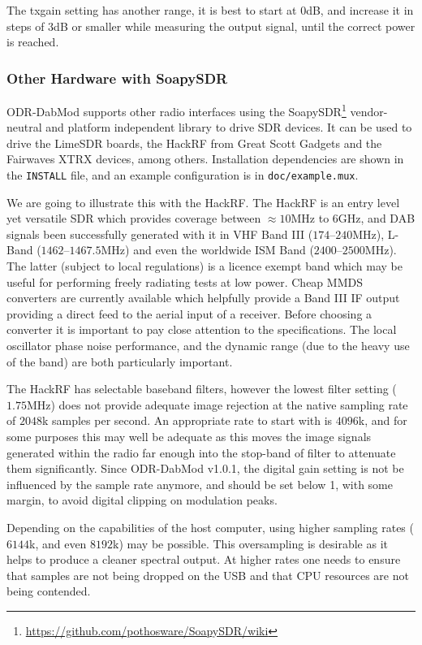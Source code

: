 The txgain setting has another range, it is best to start at $0$dB, and increase
it in steps of $3$dB or smaller while measuring the output signal, until the
correct power is reached.

\subsubsection{Other Hardware with SoapySDR}
\label{otherhardware}
ODR-DabMod supports other radio interfaces using the
SoapySDR\footnote{\url{https://github.com/pothosware/SoapySDR/wiki}}
vendor-neutral and platform independent library to drive SDR devices. It can be
used to drive the LimeSDR boards, the HackRF from Great Scott Gadgets and the
Fairwaves XTRX devices, among others. Installation dependencies are shown in the
\texttt{INSTALL} file, and an example configuration is in
\texttt{doc/example.mux}.

We are going to illustrate this with the HackRF.
The HackRF is an entry level yet versatile SDR which provides coverage between
$\approx10$MHz to $6$GHz, and DAB signals been successfully generated with it in
VHF Band III ($174$--$240$MHz), L-Band ($1462$--$1467.5$MHz) and even the worldwide ISM
Band ($2400$--$2500$MHz). The latter (subject to local regulations) is a licence exempt
band which may be useful for performing freely radiating tests at low power. Cheap
MMDS converters are currently available which helpfully provide a Band III IF output
providing a direct feed to the aerial input of a receiver. Before choosing a converter
it is important to pay close attention to the specifications. The local oscillator
phase noise performance, and the dynamic range (due to the heavy use of the band) are
both particularly important.

The HackRF has selectable baseband filters, however the lowest filter setting
($1.75$MHz) does not provide adequate image rejection at the native sampling rate of
$2048$k samples per second. An appropriate rate to start with is $4096$k, and for
some purposes this may well be adequate as this moves the image signals
generated within the radio far enough into the stop-band of filter to attenuate
them significantly. Since ODR-DabMod v1.0.1, the digital gain setting is not
be influenced by the sample rate anymore, and should be set below 1, with some
margin, to avoid digital clipping on modulation peaks.

Depending on the capabilities of the host computer, using higher sampling rates
($6144$k, and even $8192$k) may be possible. This oversampling is desirable as
it helps to produce a cleaner spectral output. At higher rates one needs to
ensure that samples are not being dropped on the USB and that CPU resources are
not being contended.

